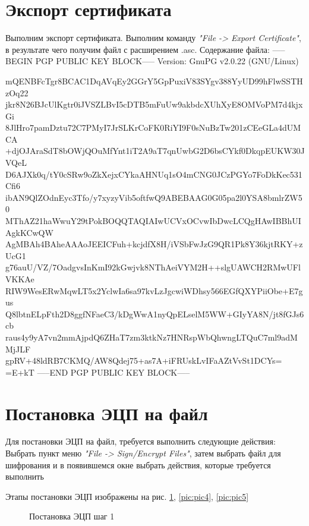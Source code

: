 \documentclass[10pt,a4paper]{report}
\begin{document}
\section{Экспорт сертификата}
Выполним экспорт сертификата.
Выполним команду \textit{"File ->  Export Certificate"}, в результате чего получим файл с расширением .asc. Содержание файла:
-----BEGIN PGP PUBLIC KEY BLOCK-----
Version: GnuPG v2.0.22 (GNU/Linux)

mQENBFcTgr8BCAC1DqAVqEy2GGrY5GpPuxiV83SYgv388YyUD99hFlwSSTHzOq22
jkr8N26BJcUlKgtr0iJVSZLBvI5cDTB5mFuUw9akbdcXUhXyE8OMVoPM7d4kjxGi
8JlHro7pamDztu72C7PMyI7JrSLKrCoFK0RiYI9F0sNuBzTw201zCEeGLa4dUMCA
+djOJAraSdT8bOWjQOuMfYnt1iT2A9aT7qnUwbG2D6bsCYkf0DkqpEUKW30JVQeL
D6AJXk0q/tY0cSRw9oZkXejxCYkaAHNUq1sO4mCNG0JCzPGYo7FoDkKec531Cfi6
ibAN9QlZOdnEyc3Tfo/y7xyzyVib5oftfwQ9ABEBAAG0G05pa2l0YSA8bmlrZW50
MThAZ21haWwuY29tPokBOQQTAQIAIwUCVxOCvwIbDwcLCQgHAwIBBhUIAgkKCwQW
AgMBAh4BAheAAAoJEEICFuh+kcjdfX8H/iVSbFwJzG9QR1Pk8Y36kjtRKY+zUcG1
g76auU/VZ/7OadgvsInKmI92kGwjvk8NThAeiVYM2H++slgUAWCH2RMwUFlVKKAe
RIW9WesERwMqwLT5x2YclwIa6sa97kvLzJgcwiWDhsy566EGfQXYPiiObe+E7gus
Q8lbtnELpFth2D8ggfNFaeC3/kDgWwA1nyQpELselM5WW+GIyYA8N/jt8fGJs6cb
raus4y9yA7vn2mmAjpdQ6ZHaT7zm3ktkNz7HNRspWbQhwngLTQuC7ml9adMMjJLF
gpRV+48ldRB7CKMQ/AW8Qdej75+as7A+iFRUskLvIFaAZtVvSt1DCYs=
=E+kT
-----END PGP PUBLIC KEY BLOCK-----

\section{Постановка ЭЦП на файл}
Для постановки ЭЦП на файл, требуется выполнить следующие действия:
 Выбрать пункт меню \textit{"File -> Sign/Encrypt Files"}, затем выбрать файл для шифрования и в появившемся окне выбрать действия, которые требуется выполнить

Этапы постановки ЭЦП изображены на рис. \ref{pic:pic3}, \ref{pic:pic4}, \ref{pic:pic5}

\begin{figure}[h]
	\caption{Постановка ЭЦП шаг 1}
	\label{pic:pic3}
\end{figure}
\end{document}
